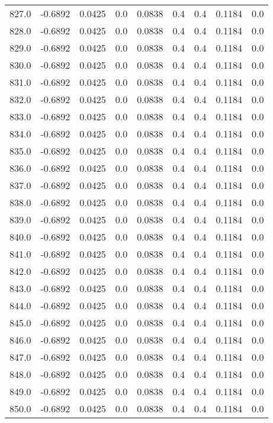 \begin{longtable}{lrrrrrrrr}
827.0 & -0.6892 & 0.0425 & 0.0 & 0.0838 & 0.4 & 0.4 & 0.1184 & 0.0 \\
828.0 & -0.6892 & 0.0425 & 0.0 & 0.0838 & 0.4 & 0.4 & 0.1184 & 0.0 \\
829.0 & -0.6892 & 0.0425 & 0.0 & 0.0838 & 0.4 & 0.4 & 0.1184 & 0.0 \\
830.0 & -0.6892 & 0.0425 & 0.0 & 0.0838 & 0.4 & 0.4 & 0.1184 & 0.0 \\
831.0 & -0.6892 & 0.0425 & 0.0 & 0.0838 & 0.4 & 0.4 & 0.1184 & 0.0 \\
832.0 & -0.6892 & 0.0425 & 0.0 & 0.0838 & 0.4 & 0.4 & 0.1184 & 0.0 \\
833.0 & -0.6892 & 0.0425 & 0.0 & 0.0838 & 0.4 & 0.4 & 0.1184 & 0.0 \\
834.0 & -0.6892 & 0.0425 & 0.0 & 0.0838 & 0.4 & 0.4 & 0.1184 & 0.0 \\
835.0 & -0.6892 & 0.0425 & 0.0 & 0.0838 & 0.4 & 0.4 & 0.1184 & 0.0 \\
836.0 & -0.6892 & 0.0425 & 0.0 & 0.0838 & 0.4 & 0.4 & 0.1184 & 0.0 \\
837.0 & -0.6892 & 0.0425 & 0.0 & 0.0838 & 0.4 & 0.4 & 0.1184 & 0.0 \\
838.0 & -0.6892 & 0.0425 & 0.0 & 0.0838 & 0.4 & 0.4 & 0.1184 & 0.0 \\
839.0 & -0.6892 & 0.0425 & 0.0 & 0.0838 & 0.4 & 0.4 & 0.1184 & 0.0 \\
840.0 & -0.6892 & 0.0425 & 0.0 & 0.0838 & 0.4 & 0.4 & 0.1184 & 0.0 \\
841.0 & -0.6892 & 0.0425 & 0.0 & 0.0838 & 0.4 & 0.4 & 0.1184 & 0.0 \\
842.0 & -0.6892 & 0.0425 & 0.0 & 0.0838 & 0.4 & 0.4 & 0.1184 & 0.0 \\
843.0 & -0.6892 & 0.0425 & 0.0 & 0.0838 & 0.4 & 0.4 & 0.1184 & 0.0 \\
844.0 & -0.6892 & 0.0425 & 0.0 & 0.0838 & 0.4 & 0.4 & 0.1184 & 0.0 \\
845.0 & -0.6892 & 0.0425 & 0.0 & 0.0838 & 0.4 & 0.4 & 0.1184 & 0.0 \\
846.0 & -0.6892 & 0.0425 & 0.0 & 0.0838 & 0.4 & 0.4 & 0.1184 & 0.0 \\
847.0 & -0.6892 & 0.0425 & 0.0 & 0.0838 & 0.4 & 0.4 & 0.1184 & 0.0 \\
848.0 & -0.6892 & 0.0425 & 0.0 & 0.0838 & 0.4 & 0.4 & 0.1184 & 0.0 \\
849.0 & -0.6892 & 0.0425 & 0.0 & 0.0838 & 0.4 & 0.4 & 0.1184 & 0.0 \\
850.0 & -0.6892 & 0.0425 & 0.0 & 0.0838 & 0.4 & 0.4 & 0.1184 & 0.0 \\

\end{longtable}
